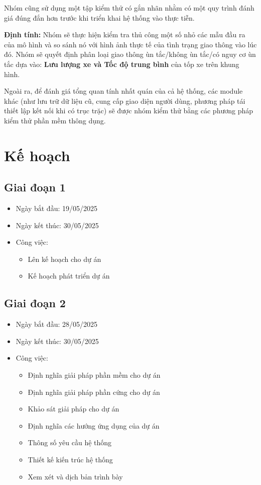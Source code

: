 \quad Nhóm cũng sử dụng một tập kiểm thử có gắn nhãn nhằm có một quy trình đánh giá đúng đắn hơn trước khi triển khai hệ thống vào thực tiễn.

\quad \textbf{Định tính:} Nhóm sẽ thực hiện kiểm tra thủ công một số nhỏ các mẫu đầu ra của mô hình và so sánh nó với hình ảnh thực tế của tình trạng giao thông vào lúc đó. Nhóm sẽ quyết định phân loại giao thông ùn tắc/không ùn tắc/có nguy cơ ùn tắc dựa vào: \textbf{Lưu lượng xe và Tốc độ trung bình} của tốp xe trên khung hình.

\quad Ngoài ra, để đánh giá tổng quan tính nhất quán của cả hệ thống, các module khác (như lưu trữ dữ liệu cũ, cung cấp giao diện người dùng, phương pháp tái thiết lập kết nối khi có trục trặc) sẽ được nhóm kiểm thử bằng các phương pháp kiểm thử phần mềm thông dụng.

\section{Kế hoạch}
\subsection{Giai đoạn 1}
\begin{itemize}
    \item Ngày bắt đầu: 19/05/2025
    \item Ngày kết thúc: 30/05/2025
    \item Công việc:
    \begin{itemize}
        \item Lên kế hoạch cho dự án
        \item Kế hoạch phát triển dự án
    \end{itemize}
\end{itemize}

\subsection{Giai đoạn 2}

\begin{itemize}
    \item Ngày bắt đầu: 28/05/2025
    \item Ngày kết thúc: 30/05/2025
    \item Công việc:
    \begin{itemize}
        \item Định nghĩa giải pháp phần mềm cho dự án
        \item Định nghĩa giải pháp phần cứng cho dự án
        \item Khảo sát giải pháp cho dự án
        \item Định nghĩa các hướng ứng dụng của dự án
        \item Thông số yêu cầu hệ thống
        \item Thiết kế kiến trúc hệ thống
        \item Xem xét và dịch bản trình bày
    \end{itemize}
\end{itemize}


